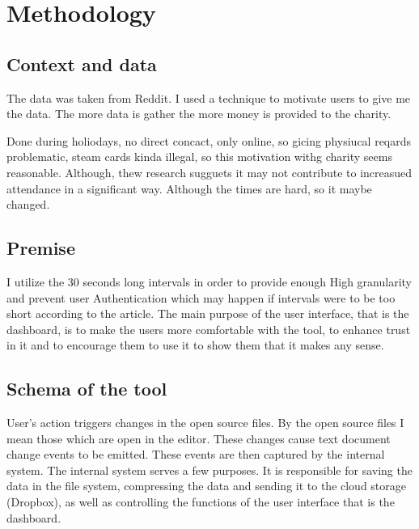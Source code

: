 \chapter{Methodology}\label{ch:methodology}

\section{Context and data}


The data was taken from Reddit. I used a technique to motivate users to give me the data. The more data is gather the more money is provided to the charity.

Done during holiodays, no direct concact, only online, so gicing physiucal reqards problematic, steam cards kinda illegal, so this motivation withg  charity seems reasonable. Although, thew research sugguets it may not contribute to increasued attendance in a significant way. Although the times are hard, so it maybe changed.



\section{Premise}

I utilize the 30 seconds long intervals in order to provide enough High granularity and prevent user Authentication which may happen if intervals were to be too short according to the article. The main purpose of the user interface, that is the dashboard, is to make the users more comfortable with the tool, to enhance trust in it and to encourage them to use it to show them that it makes any sense.

\section{Schema of the tool}

User's action triggers changes in the open source files. By the open source files I mean those which are open in the editor. These changes cause text document change events to be emitted. These events are then captured by the internal system. The internal system serves a few purposes. It is responsible for saving the data in the file system, compressing the data and sending it to the cloud storage (Dropbox), as well as controlling the functions of the user interface that is the dashboard.

